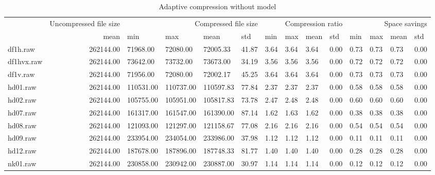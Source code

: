 \begin{table}
\caption{Adaptive compression without model}
\begin{tabular}{lrllllllllllll}
 & Uncompressed file size & \multicolumn{4}{r}{Compressed file size} & \multicolumn{4}{r}{Compression ratio} & \multicolumn{4}{r}{Space savings} \\
 & mean & min & max & mean & std & min & max & mean & std & min & max & mean & std \\
df1h.raw & 262144.00 & 71968.00 & 72080.00 & 72005.33 & 41.87 & 3.64 & 3.64 & 3.64 & 0.00 & 0.73 & 0.73 & 0.73 & 0.00 \\
df1hvx.raw & 262144.00 & 73642.00 & 73732.00 & 73673.00 & 34.19 & 3.56 & 3.56 & 3.56 & 0.00 & 0.72 & 0.72 & 0.72 & 0.00 \\
df1v.raw & 262144.00 & 71956.00 & 72080.00 & 72002.17 & 45.25 & 3.64 & 3.64 & 3.64 & 0.00 & 0.73 & 0.73 & 0.73 & 0.00 \\
hd01.raw & 262144.00 & 110531.00 & 110737.00 & 110597.83 & 77.84 & 2.37 & 2.37 & 2.37 & 0.00 & 0.58 & 0.58 & 0.58 & 0.00 \\
hd02.raw & 262144.00 & 105755.00 & 105951.00 & 105817.83 & 73.78 & 2.47 & 2.48 & 2.48 & 0.00 & 0.60 & 0.60 & 0.60 & 0.00 \\
hd07.raw & 262144.00 & 161317.00 & 161547.00 & 161390.00 & 87.14 & 1.62 & 1.63 & 1.62 & 0.00 & 0.38 & 0.38 & 0.38 & 0.00 \\
hd08.raw & 262144.00 & 121093.00 & 121297.00 & 121158.67 & 77.08 & 2.16 & 2.16 & 2.16 & 0.00 & 0.54 & 0.54 & 0.54 & 0.00 \\
hd09.raw & 262144.00 & 233954.00 & 234054.00 & 233986.00 & 37.98 & 1.12 & 1.12 & 1.12 & 0.00 & 0.11 & 0.11 & 0.11 & 0.00 \\
hd12.raw & 262144.00 & 187678.00 & 187896.00 & 187748.33 & 81.77 & 1.40 & 1.40 & 1.40 & 0.00 & 0.28 & 0.28 & 0.28 & 0.00 \\
nk01.raw & 262144.00 & 230858.00 & 230942.00 & 230887.00 & 30.97 & 1.14 & 1.14 & 1.14 & 0.00 & 0.12 & 0.12 & 0.12 & 0.00 \\
\end{tabular}
\end{table}
